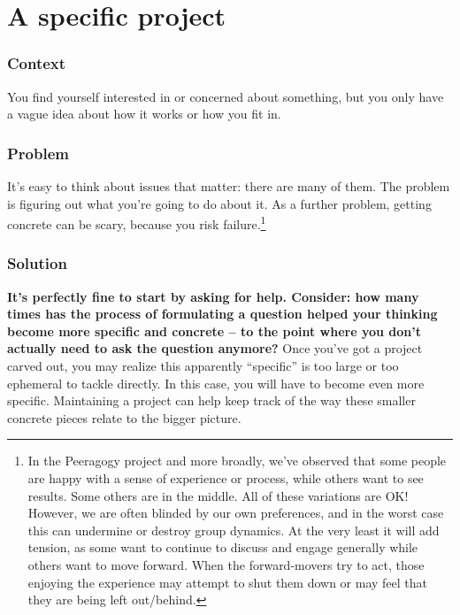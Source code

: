\begingroup \color{BurntOrange}

\section{A specific project}\label{sec:A_specific_project}
\subsubsection*{Context}
You find yourself interested in or concerned about something, but you
only have a vague idea about how it works or how you fit in.

\subsubsection*{Problem}
It's easy to think about issues that matter: there are many of
them. The problem is figuring out what you're going to do about it.
As a further problem, getting concrete can be scary, because you risk
failure.\footnote{In the Peeragogy project and more broadly, we've
  observed that some people are happy with a sense of experience or
  process, while others want to see results. Some others are in the
  middle.  All of these variations are OK!  However, we are often
  blinded by our own preferences, and in the worst case this can
  undermine or destroy group dynamics.  At the very least it will add
  tension, as some want to continue to discuss and engage generally
  while others want to move forward.  When the forward-movers try to
  act, those enjoying the experience may attempt to shut them down or
  may feel that they are being left out/behind.}

\subsubsection*{Solution} 
\textbf{It's perfectly fine to start by asking for help.  Consider: how many times has the process of formulating a question helped your thinking become more specific and concrete -- to the point where you don't actually need to ask the question anymore?}  Once you've got a project carved out, you may realize this apparently ``specific'' is too large or too ephemeral to tackle directly. In this case, you will have to become even more specific. Maintaining a project  can help keep track of the way these smaller concrete pieces relate to the bigger picture.  


